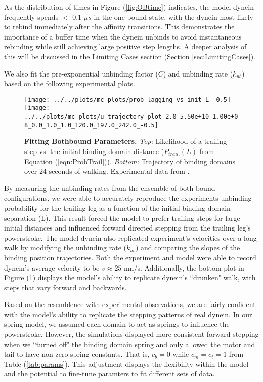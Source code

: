 As the distribution of times in Figure (\ref{fig:OBtime}) indicates, the model dynein frequently spends $<$ 0.1 $\mu s$ in the one-bound state, with the dynein most likely to rebind immediately after the affinity transitions. This demonstrates the importance of a buffer time when the dynein unbinds to avoid instantaneous rebinding while still achieving large positive step lengths. A deeper analysis of this will be discussed in the Limiting Cases section (Section \ref{sec:LimitingCases}).

We also fit the pre-exponential unbinding factor ($C$) and unbinding rate ($k_{ub}$) based on the following experimental plots.

\begin{figure}[H]
	\centering
	\texttt{[image: ../../plots/mc\_plots/prob\_lagging\_vs\_init\_L\_-0.5]}
	\texttt{[image: ../../plots/mc\_plots/u\_trajectory\_plot\_2.0\_5.50e+10\_1.00e+08\_0.0\_1.0\_1.0\_120.0\_197.0\_242.0\_-0.5]}
	\caption[Fitting Bothbound Parameters]{\textbf{Fitting Bothbound Parameters.} \textit{Top: }Likelihood of a trailing step vs. the initial binding domain distance ($P_{trail.}(L)$ from Equation (\ref{eqn:ProbTrail})). \textit{Bottom: }Trajectory of binding domains over 24 seconds of walking. Experimental data from \cite{Dewitt2012}.}
	\label{fig:BBPlots}
\end{figure}

By measuring the unbinding rates from the ensemble of both-bound configurations, we were able to accurately reproduce the experiments unbinding probability for the trailing leg as a function of the initial binding domain separation (L). This result forced the model to prefer trailing steps for large initial distances and influenced forward directed stepping from the trailing leg's powerstroke. The model dynein also replicated experiment's velocities over a long walk by modifying the unbinding rate ($k_{ub}$) and comparing the slopes of the binding position trajectories. Both the experiment and model were able to record dynein's average velocity to be $v\approx25$ nm/s. Additionally, the bottom plot in Figure (\ref{fig:BBPlots}) displays the model's ability to replicate dynein's ``drunken" walk, with steps that vary forward and backwards. 

Based on the resemblence with experimental observations, we are fairly confident with the model's ability to replicate the stepping patterns of real dynein. In our spring model, we assumed each domain to act as springs to influence the powerstroke. However, the simulations displayed more consistent forward stepping when we ``turned off" the binding domain spring and only allowed the motor and tail to have non-zero spring constants. That is, $c_b=0$ while $c_m=c_t=1$ from Table (\ref{tab:params}). This adjustment displays the flexibility within the model and the potential to fine-tune paramters to fit different sets of data. 

